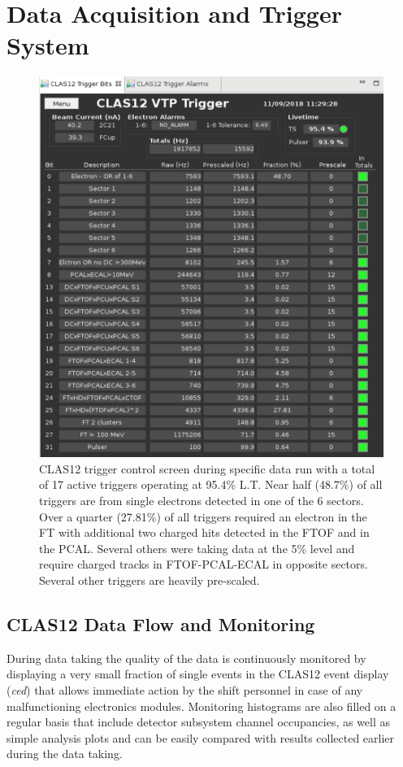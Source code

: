 \documentclass[final,3p,twocolumn]{elsarticle}
\begin{document}
\section{Data Acquisition and Trigger System} 
\begin{figure}[t!]
\centerline{\includegraphics[width=1.0\columnwidth]{CLAS12-triggers.png}}
\caption{CLAS12 trigger control screen during specific data run with a total of 17 active triggers operating at 95.4\% L.T.  
Near half (48.7\%) of all
triggers are from single electrons detected in one of the 6 sectors. Over a quarter (27.81\%) of all triggers required an electron in 
the FT with additional two charged hits detected in the FTOF and in the PCAL. Several others were taking data at the 5\% level and require charged tracks in FTOF-PCAL-ECAL in opposite sectors. Several other triggers are heavily pre-scaled. }
\label{CLAS12-triggers}
\end{figure}

\subsection {CLAS12 Data Flow and Monitoring} 

During data taking the quality of the data is continuously monitored by displaying a very small fraction of single
events in the CLAS12 event display ({\it ced}) that allows immediate action by the shift personnel in case of any
malfunctioning electronics modules. 
Monitoring histograms are also filled on a regular basis that include detector subsystem channel occupancies,
as well as simple analysis plots and can be easily compared with results collected earlier during the data taking.  
\end{document}
